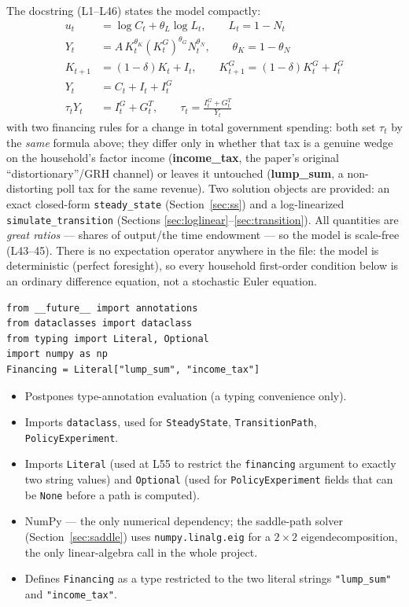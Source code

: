 \documentclass[11pt]{article}
\begin{document}
The docstring (L1--L46) states the model compactly:
\begin{align}
u_t &= \log C_t + \theta_L\log L_t, \qquad L_t = 1-N_t \tag{preferences}\\
Y_t &= A\,K_t^{\theta_K}(K^G_t)^{\theta_G}N_t^{\theta_N}, \qquad \theta_K=1-\theta_N \tag{technology}\\
K_{t+1} &= (1-\delta)K_t+I_t, \qquad K^G_{t+1}=(1-\delta)K^G_t+I^G_t \tag{capital accum.}\\
Y_t &= C_t+I_t+I^G_t \tag{resource constraint}\\
\tau_t Y_t &= I^G_t+G^T_t, \qquad \tau_t=\frac{I^G_t+G^T_t}{Y_t} \tag{government budget}
\end{align}
with two financing rules for a change in total government spending: both set
$\tau_t$ by the \emph{same} formula above; they differ only in whether that
tax is a genuine wedge on the household's factor income
(\textbf{income\_tax}, the paper's original ``distortionary''/GRH channel)
or leaves it untouched (\textbf{lump\_sum}, a non-distorting poll tax for
the same revenue). Two solution objects are provided: an exact closed-form
\texttt{steady\_state} (Section~\ref{sec:ss}) and a log-linearized
\texttt{simulate\_transition} (Sections \ref{sec:loglinear}--\ref{sec:transition}).
All quantities are \emph{great ratios} --- shares of output/the time
endowment --- so the model is scale-free (L43--45). There is no expectation
operator anywhere in the file: the model is deterministic (perfect
foresight), so every household first-order condition below is an ordinary
difference equation, not a stochastic Euler equation.

\begin{lstlisting}[firstnumber=48]
from __future__ import annotations
from dataclasses import dataclass
from typing import Literal, Optional
import numpy as np
Financing = Literal["lump_sum", "income_tax"]
\end{lstlisting}
\begin{itemize}
\item[\textbf{L48}] Postpones type-annotation evaluation (a typing
convenience only).
\item[\textbf{L50}] Imports \texttt{dataclass}, used for \texttt{SteadyState},
\texttt{TransitionPath}, \texttt{PolicyExperiment}.
\item[\textbf{L51}] Imports \texttt{Literal} (used at L55 to restrict the
\texttt{financing} argument to exactly two string values) and
\texttt{Optional} (used for \texttt{PolicyExperiment} fields that can be
\texttt{None} before a path is computed).
\item[\textbf{L53}] NumPy --- the only numerical dependency; the saddle-path
solver (Section~\ref{sec:saddle}) uses \texttt{numpy.linalg.eig} for a
$2\times2$ eigendecomposition, the only linear-algebra call in the whole
project.
\item[\textbf{L55}] Defines \texttt{Financing} as a type restricted to the
two literal strings \texttt{"lump\_sum"} and \texttt{"income\_tax"}.
\end{itemize}
\end{document}
